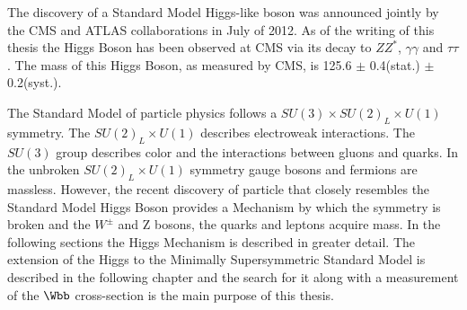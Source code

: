 The discovery of a Standard Model Higgs-like boson was announced jointly 
by the CMS and ATLAS collaborations in July of 2012. %
As of the writing of this thesis the Higgs Boson has been observed at CMS via
its decay to $ZZ^{*}$, $\gamma\gamma$ and $\tau\tau$. The mass of this
Higgs Boson, as measured by CMS, is 125.6 $\pm$ 0.4(stat.) $\pm$ 0.2(syst.).

The Standard Model of particle physics follows a $SU(3)\times SU(2)_{L}\times U(1)$ %
symmetry. The $SU(2)_{L}\times U(1)$ describes electroweak interactions.
The $SU(3)$ group describes color and the interactions
between gluons and quarks. In the unbroken $SU(2)_{L}\times U(1)$ symmetry
gauge bosons and fermions are massless. However, the recent
discovery of particle that closely resembles the Standard Model Higgs
Boson provides a Mechanism by which the symmetry is broken
and the $W^{\pm}$ and Z bosons, the quarks and leptons acquire mass. 
In the following sections the Higgs Mechanism is described in greater detail.
The extension of the Higgs to the Minimally Supersymmetric Standard Model
is described in the following chapter and the search for it along with
a measurement of the $\Wbb$ cross-section is the main purpose of this
thesis.
